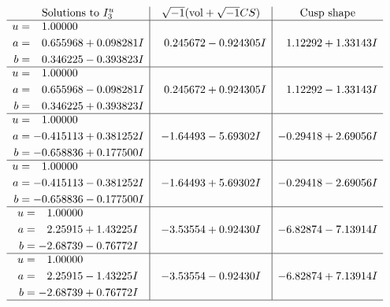\documentclass[1p]{elsarticle_modified}
\theoremstyle{definition}
\newcommand{\I}{\sqrt{-1}}
\begin{document}
$$\begin{array}{c|c|c}  
\text{Solutions to }I^u_{3}& \I (\text{vol} + \sqrt{-1}CS) & \text{Cusp shape}\\
 \hline 
\begin{aligned}
u &= \phantom{-}1.00000\phantom{ +0.000000I} \\
a &= \phantom{-}0.655968 + 0.098281 I \\
b &= \phantom{-}0.346225 - 0.393823 I\end{aligned}
 & \phantom{-}0.245672 - 0.924305 I & \phantom{-}1.12292 + 1.33143 I \\ \hline\begin{aligned}
u &= \phantom{-}1.00000\phantom{ +0.000000I} \\
a &= \phantom{-}0.655968 - 0.098281 I \\
b &= \phantom{-}0.346225 + 0.393823 I\end{aligned}
 & \phantom{-}0.245672 + 0.924305 I & \phantom{-}1.12292 - 1.33143 I \\ \hline\begin{aligned}
u &= \phantom{-}1.00000\phantom{ +0.000000I} \\
a &= -0.415113 + 0.381252 I \\
b &= -0.658836 + 0.177500 I\end{aligned}
 & -1.64493 - 5.69302 I & -0.29418 + 2.69056 I \\ \hline\begin{aligned}
u &= \phantom{-}1.00000\phantom{ +0.000000I} \\
a &= -0.415113 - 0.381252 I \\
b &= -0.658836 - 0.177500 I\end{aligned}
 & -1.64493 + 5.69302 I & -0.29418 - 2.69056 I \\ \hline\begin{aligned}
u &= \phantom{-}1.00000\phantom{ +0.000000I} \\
a &= \phantom{-}2.25915 + 1.43225 I \\
b &= -2.68739 - 0.76772 I\end{aligned}
 & -3.53554 + 0.92430 I & -6.82874 - 7.13914 I \\ \hline\begin{aligned}
u &= \phantom{-}1.00000\phantom{ +0.000000I} \\
a &= \phantom{-}2.25915 - 1.43225 I \\
b &= -2.68739 + 0.76772 I\end{aligned}
 & -3.53554 - 0.92430 I & -6.82874 + 7.13914 I\\
 \hline 
 \end{array}$$\newpage\newpage\renewcommand{\arraystretch}{1}
\end{document}
